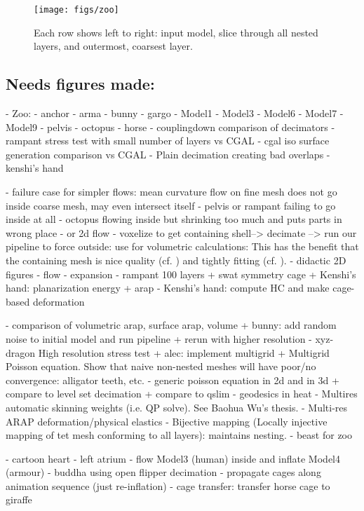 




\begin{figure*}
  \texttt{[image: figs/zoo]}
  \caption{Each row shows left to right: input model, slice through all nested
  layers, and outermost, coarsest layer.}
  \label{fig:zoo}
\end{figure*}

\subsection{Needs figures made:}
- Zoo:
  - anchor
  - arma
  - bunny
  - gargo
  - Model1
  - Model3
  - Model6
  - Model7
  - Model9
  - pelvis
  - octopus
  - horse
- couplingdown comparison of decimators
- rampant stress test with small number of layers vs CGAL
- cgal iso surface generation comparison vs CGAL
- Plain decimation creating bad overlaps
- kenshi's hand


- failure case for simpler flows: mean curvature flow on fine mesh does not
  go inside coarse mesh, may even intersect itself
    - pelvis or rampant failing to go inside at all
    - octopus flowing inside but shrinking too much and puts parts in wrong
      place
    - or 2d flow
- voxelize to get containing shell--> decimate --> run our pipeline to force
  outside: use for volumetric calculations: This has the benefit that the
  containing mesh is nice quality (cf. \cite{Jacobson:WN:2013}) and tightly
  fitting (cf. \cite{Xu:2014:SDF}).
- didactic 2D figures
  - flow
  - expansion
- rampant 100 layers
+ swat symmetry cage
+ Kenshi's hand: planarization energy + arap
- Kenshi's hand: compute HC and make cage-based deformation

- comparison of volumetric arap, surface arap, volume
+ bunny: add random noise to initial model and run pipeline
  + rerun with higher resolution
- xyz-dragon High resolution stress test
+ alec: implement multigrid
  + Multigrid Poisson equation. Show that naive non-nested meshes will have
    poor/no convergence: alligator teeth, etc.
      - generic poisson equation in 2d and in 3d
        + compare to level set decimation
        + compare to qslim
      - geodesics in heat 
  - Multires automatic skinning weights (i.e. QP solve). See Baohua Wu's thesis.
  - Multi-res ARAP deformation/physical elastics
  - Bijective mapping (Locally injective mapping of tet mesh conforming to all
    layers): maintains nesting.
- beast for zoo

- cartoon heart
- left atrium
- flow Model3 (human) inside and inflate Model4 (armour)
- buddha using open flipper decimation
- propagate cages along animation sequence (just re-inflation)
- cage transfer: transfer horse cage to giraffe

